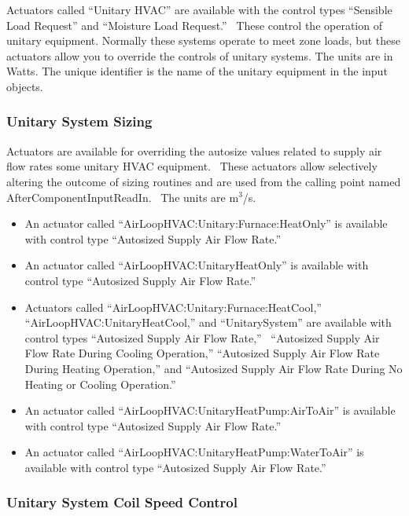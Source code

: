 Actuators called ``Unitary HVAC'' are available with the control types ``Sensible Load Request'' and ``Moisture Load Request.''~ These control the operation of unitary equipment. Normally these systems operate to meet zone loads, but these actuators allow you to override the controls of unitary systems. The units are in Watts. The unique identifier is the name of the unitary equipment in the input objects.

\subsubsection{Unitary System Sizing}\label{unitary-system-sizing}

Actuators are available for overriding the autosize values related to supply air flow rates some unitary HVAC equipment.~ These actuators allow selectively altering the outcome of sizing routines and are used from the calling point named AfterComponentInputReadIn.~ The units are m\(^{3}\)/s.

\begin{itemize}
\item
  An actuator called ``AirLoopHVAC:Unitary:Furnace:HeatOnly'' is available with control type ``Autosized Supply Air Flow Rate.''
\item
  An actuator called ``AirLoopHVAC:UnitaryHeatOnly'' is available with control type ``Autosized Supply Air Flow Rate.''
\item
  Actuators called ``AirLoopHVAC:Unitary:Furnace:HeatCool,''  ``AirLoopHVAC:UnitaryHeatCool,'' and ``UnitarySystem'' are available with control types ``Autosized Supply Air Flow Rate,''~ ``Autosized Supply Air Flow Rate During Cooling Operation,'' ``Autosized Supply Air Flow Rate During Heating Operation,'' and ``Autosized Supply Air Flow Rate During No Heating or Cooling Operation.''
\item
  An actuator called ``AirLoopHVAC:UnitaryHeatPump:AirToAir'' is available with control type ``Autosized Supply Air Flow Rate.''
\item
  An actuator called ``AirLoopHVAC:UnitaryHeatPump:WaterToAir'' is available with control type ``Autosized Supply Air Flow Rate.''
\end{itemize}

\subsubsection{Unitary System Coil Speed Control}\label{unitary-system-coil-speed-ctrl}

